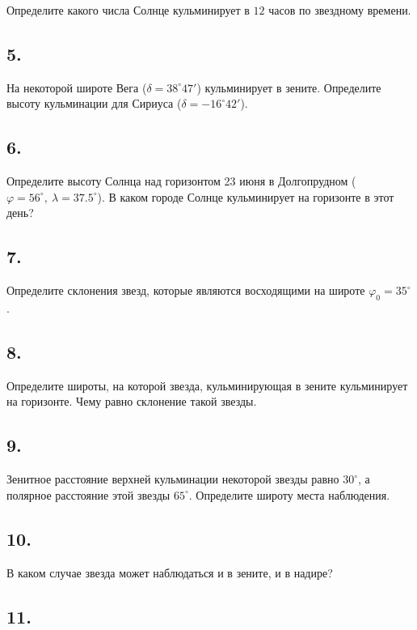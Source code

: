 \documentclass[a4paper,12pt]{article}
\begin{document}
Определите какого числа Солнце кульминирует в $12$ часов по звездному времени. 

\subsection*{5. }

На некоторой широте Вега ($\delta = 38^{\circ} 47'$) кульминирует в зените. Определите высоту кульминации для Сириуса ($\delta = -16^{\circ} 42'$).

\subsection*{6. }

Определите высоту Солнца над горизонтом 23 июня в Долгопрудном ($\varphi = 56^{\circ},~\lambda = 37.5^{\circ}$). В каком городе Солнце кульминирует на горизонте в этот день?  %

\subsection*{7. }

Определите склонения звезд, которые являются восходящими на широте $\varphi_0 = 35^{\circ}$.

\subsection*{8.}

Определите широты, на которой звезда, кульминирующая в зените кульминирует на горизонте. Чему равно склонение такой звезды.

\subsection*{9.} Зенитное расстояние верхней кульминации некоторой звезды равно $30^{\circ}$, а полярное расстояние этой звезды $65^{\circ}$. Определите широту места наблюдения.

\subsection*{10.}

В каком случае звезда может наблюдаться и в зените, и в надире?

\subsection*{11.}
\end{document}
